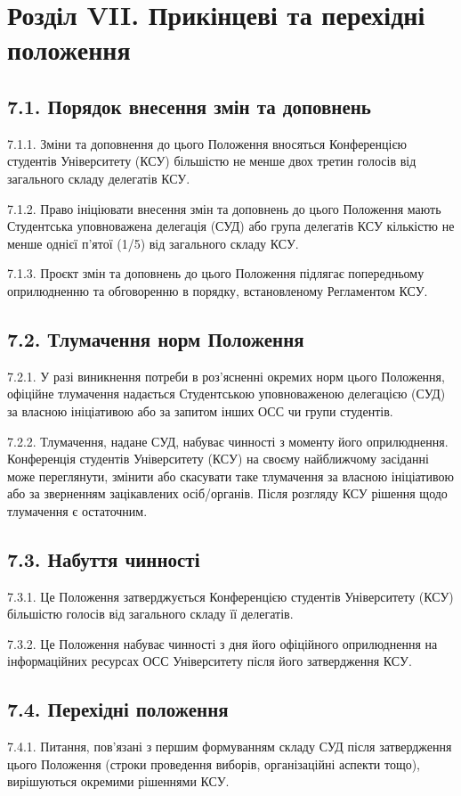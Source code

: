 \section*{Розділ VII. Прикінцеві та перехідні положення}

\subsection*{7.1. Порядок внесення змін та доповнень}
    7.1.1. Зміни та доповнення до цього Положення вносяться Конференцією студентів Університету (КСУ) більшістю не менше двох третин голосів від загального складу делегатів КСУ.

    7.1.2. Право ініціювати внесення змін та доповнень до цього Положення мають Студентська уповноважена делегація (СУД) або група делегатів КСУ кількістю не менше однієї п'ятої (1/5) від загального складу КСУ.

    7.1.3. Проєкт змін та доповнень до цього Положення підлягає попередньому оприлюдненню та обговоренню в порядку, встановленому Регламентом КСУ.

\subsection*{7.2. Тлумачення норм Положення}
    7.2.1. У разі виникнення потреби в роз'ясненні окремих норм цього Положення, офіційне тлумачення надається Студентською уповноваженою делегацією (СУД) за власною ініціативою або за запитом інших ОСС чи групи студентів.

    7.2.2. Тлумачення, надане СУД, набуває чинності з моменту його оприлюднення. Конференція студентів Університету (КСУ) на своєму найближчому засіданні може переглянути, змінити або скасувати таке тлумачення за власною ініціативою або за зверненням зацікавлених осіб/органів. Після розгляду КСУ рішення щодо тлумачення є остаточним.

\subsection*{7.3. Набуття чинності}
    7.3.1. Це Положення затверджується Конференцією студентів Університету (КСУ) більшістю голосів від загального складу її делегатів.

    7.3.2. Це Положення набуває чинності з дня його офіційного оприлюднення на інформаційних ресурсах ОСС Університету після його затвердження КСУ.

\subsection*{7.4. Перехідні положення}
    7.4.1. Питання, пов'язані з першим формуванням складу СУД після затвердження цього Положення (строки проведення виборів, організаційні аспекти тощо), вирішуються окремими рішеннями КСУ. 
